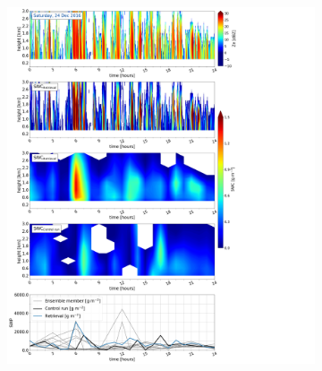     \begin{figure}\ContinuedFloat
   		\centering
		\begin{subfigure}[b]{0.8\textwidth}
			\includegraphics[trim={0.5cm 0.5cm 17.5cm .5cm},clip,width=\textwidth]{./fig_SWC/20161224}
			\caption{}\label{fig:SWC24}
		\end{subfigure}
	\end{figure}
